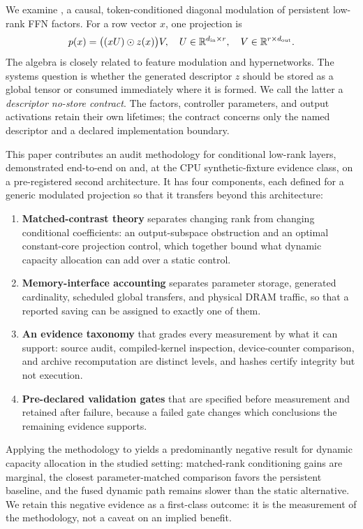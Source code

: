 We examine \mwg, a causal, token-conditioned diagonal modulation of persistent
low-rank FFN factors. For a row vector $x$, one projection is
\begin{equation}
 p(x)=\bigl((xU)\odot z(x)\bigr)V,
 \quad U\in\mathbb{R}^{d_{\rm in}\times r},\quad V\in\mathbb{R}^{r\times d_{\rm out}}.
 \label{eq:projection}
\end{equation}
The algebra is closely related to feature modulation and hypernetworks.
The systems question is whether the generated descriptor $z$ should be stored
as a global tensor or consumed immediately where it is formed. We call the
latter a \emph{descriptor no-store contract}. The factors, controller parameters,
and output activations retain their own lifetimes; the contract concerns only
the named descriptor and a declared implementation boundary.

This paper contributes an audit methodology for conditional low-rank layers,
demonstrated end-to-end on \mwg{} and, at the CPU synthetic-fixture evidence
class, on a pre-registered second architecture. It has four components, each
defined for a generic modulated projection so that it transfers beyond this
architecture:
\begin{enumerate}
\item \textbf{Matched-contrast theory} separates changing rank from changing
conditional coefficients: an output-subspace obstruction and an optimal
constant-core projection control, which together bound what dynamic capacity
allocation can add over a static control.
\item \textbf{Memory-interface accounting} separates parameter storage,
generated cardinality, scheduled global transfers, and physical DRAM traffic,
so that a reported saving can be assigned to exactly one of them.
\item \textbf{An evidence taxonomy} that grades every measurement by what it
can support: source audit, compiled-kernel inspection, device-counter
comparison, and archive recomputation are distinct levels, and hashes certify
integrity but not execution.
\item \textbf{Pre-declared validation gates} that are specified before
measurement and retained after failure, because a failed gate changes which
conclusions the remaining evidence supports.
\end{enumerate}
Applying the methodology to \mwg{} yields a predominantly negative result for
dynamic capacity allocation in the studied setting: matched-rank conditioning
gains are marginal, the closest parameter-matched comparison favors the
persistent baseline, and the fused dynamic path remains slower than the static
alternative. We retain this negative evidence as a first-class outcome: it is
the measurement of the methodology, not a caveat on an implied benefit.

